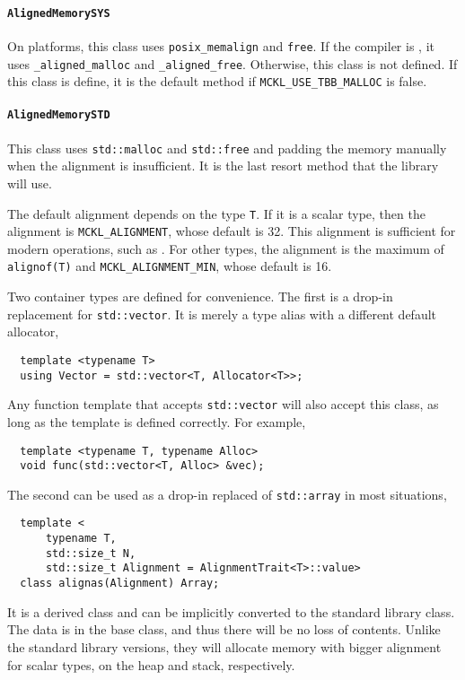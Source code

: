 \paragraph{\texttt{AlignedMemorySYS}} On \posix platforms, this class uses
\verb|posix_memalign| and \verb|free|. If the compiler is \msvc, it uses
\verb|_aligned_malloc| and \verb|_aligned_free|. Otherwise, this class is not
defined. If this class is define, it is the default method if
\verb|MCKL_USE_TBB_MALLOC| is false.

\paragraph{\texttt{AlignedMemorySTD}} This class uses \verb|std::malloc| and
\verb|std::free| and padding the memory manually when the alignment is
insufficient. It is the last resort method that the library will use.

The default alignment depends on the type \verb|T|. If it is a scalar type,
then the alignment is \verb|MCKL_ALIGNMENT|, whose default is 32. This
alignment is sufficient for modern \simd operations, such as \avx. For other
types, the alignment is the maximum of \verb|alignof(T)| and
\verb|MCKL_ALIGNMENT_MIN|, whose default is 16.

Two container types are defined for convenience. The first is a drop-in
replacement for \verb|std::vector|. It is merely a type alias with a different
default allocator,
\begin{Verbatim}
  template <typename T>
  using Vector = std::vector<T, Allocator<T>>;
\end{Verbatim}
Any function template that accepts \verb|std::vector| will also accept this
class, as long as the template is defined correctly. For example,
\begin{Verbatim}
  template <typename T, typename Alloc>
  void func(std::vector<T, Alloc> &vec);
\end{Verbatim}
The second can be used as a drop-in replaced of \verb|std::array| in most
situations,
\begin{Verbatim}
  template <
      typename T,
      std::size_t N,
      std::size_t Alignment = AlignmentTrait<T>::value>
  class alignas(Alignment) Array;
\end{Verbatim}
It is a derived class and can be implicitly converted to the standard
library class. The data is in the base class, and thus there will be no loss of
contents. Unlike the standard library versions, they will allocate memory with
bigger alignment for scalar types, on the heap and stack, respectively.

